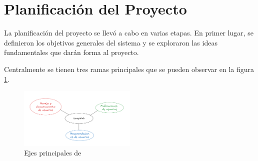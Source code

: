 \section{Planificación del Proyecto}
La planificación del proyecto se llevó a cabo en varias etapas. En primer lugar, se definieron los objetivos generales del sistema y se exploraron las ideas fundamentales que darán forma al proyecto.

Centralmente se tienen tres ramas principales que se pueden observar en la figura \ref{fig:diagrama1}.
\begin{figure}[H]
    \centering
    \includegraphics[width=0.5\textwidth]{./src/images/Diagrama1.png}
    \caption{Ejes principales de \loopweb}
    \label{fig:diagrama1}
\end{figure}

